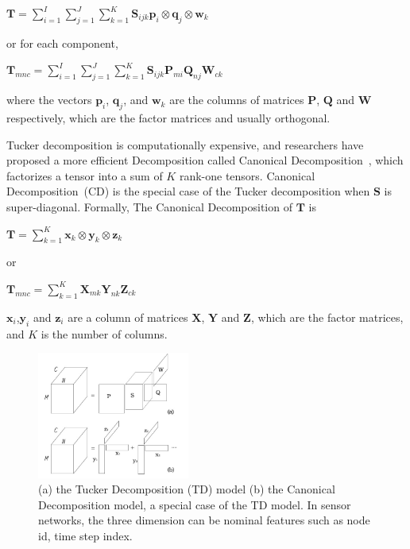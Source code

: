 \begin{center}
$\mathbf{T}=\sum\limits_{i=1}^{I}\sum\limits_{j=1}^{J}\sum\limits_{k=1}^{K}\mathbf{S}_{ijk}\mathbf{p}_i\otimes \mathbf{q}_j\otimes \mathbf{w}_k$
\end{center}
or for each component,
\begin{center}
$\mathbf{T}_{mnc}=\sum\limits_{i=1}^{I}\sum\limits_{j=1}^{J}\sum\limits_{k=1}^{K}\mathbf{S}_{ijk}\mathbf{P}_{m i}\mathbf{Q}_{n j}\mathbf{W}_{c k}$
\end{center}
where the vectors $\mathbf{p}_i$, $\mathbf{q}_j$, and $\mathbf{w}_k$ are the columns of matrices $\mathbf{P}$, $\mathbf{Q}$ and $\mathbf{W}$ respectively, which are the factor matrices and usually orthogonal.


Tucker decomposition is computationally expensive, and researchers have proposed a more efficient Decomposition called Canonical Decomposition~\cite{carroll1970analysis}, which factorizes a tensor into a sum of $K$ rank-one tensors.
Canonical Decomposition~(CD) is the special case of the Tucker decomposition when $\mathbf{S}$ is super-diagonal.
Formally, The Canonical Decomposition of $\mathbf{T}$ is
\begin{center}
$\mathbf{T}=\sum\limits_{k=1}^{K}\mathbf{x}_k\otimes \mathbf{y}_k\otimes \mathbf{z}_k$
\end{center}
or
\begin{center}
$\mathbf{T}_{mnc}=\sum\limits_{k=1}^{K}\mathbf{X}_{m k} \mathbf{Y}_{n k} \mathbf{Z}_{c k}$
\end{center}
$\mathbf{x}_i$,$\mathbf{y}_i$ and $\mathbf{z}_i$ are a column of matrices $\mathbf{X}$, $\mathbf{Y}$ and $\mathbf{Z}$, which are the factor matrices, and $K$ is the number of columns. 

\begin{figure}[h] 
\includegraphics[width=5cm]{tf.jpg} 
\caption{ (a) the Tucker Decomposition (TD) model (b) the Canonical Decomposition model, a special case of the TD model. In sensor networks, the three dimension can be nominal features such as node id, time step index.} 
\label{fig:tf:tuckcanon} 
\end{figure}

